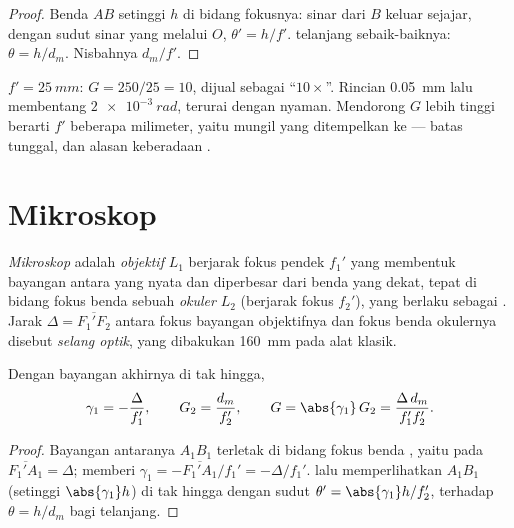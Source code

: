 \begin{proof}
Benda $AB$ setinggi $h$ di bidang fokusnya: sinar dari $B$ keluar
sejajar, dengan sudut sinar yang melalui $O$, $\theta' = h/f'$. 
telanjang sebaik-baiknya: $\theta = h/d_m$. Nisbahnya $d_m/f'$.
\end{proof}

\begin{example}\label{ex:b1:optical-instruments:loupe}
$f' = \qty{25}{mm}$: $G = 250/25 = 10$, dijual sebagai ``$10\times$''.
Rincian \qty{0.05}{mm} lalu membentang $\qty{2e-3}{rad}$, terurai dengan
nyaman. Mendorong $G$ lebih tinggi berarti $f'$ beberapa milimeter, yaitu
 mungil yang ditempelkan ke  --- batas  tunggal, dan
alasan keberadaan .
\end{example}

\section{Mikroskop}

\begin{definition}\label{def:b1:optical-instruments:microscope}
\emph{Mikroskop} adalah \emph{ objektif} $L_1$ berjarak fokus
pendek $f_1'$ yang membentuk bayangan antara yang nyata dan diperbesar
dari benda yang dekat, tepat di bidang fokus benda sebuah \emph{
okuler} $L_2$ (berjarak fokus $f_2'$), yang berlaku sebagai . Jarak $\Delta =
\overline{F_1'F_2}$ antara fokus bayangan
objektifnya dan fokus benda okulernya disebut \emph{selang
optik},
yang dibakukan \qty{160}{mm} pada alat klasik.
\end{definition}

\begin{proposition}\label{prop:b1:optical-instruments:microscope}
Dengan bayangan akhirnya di tak hingga,
\[
\gamma_1 = -\frac{\Delta}{f_1'}, \qquad G_2 = \frac{d_m}{f_2'},
\qquad G = \abs{\gamma_1}\,G_2 = \frac{\Delta\,d_m}{f_1' f_2'} .
\]
\end{proposition}

\begin{proof}
Bayangan antaranya $A_1B_1$ terletak di bidang fokus benda ,
yaitu pada $\overline{F_1'A_1} = \Delta$;  memberi
$\gamma_1 = -\overline{F_1'A_1}/f_1' = -\Delta/f_1'$.  lalu
memperlihatkan $A_1B_1$ (setinggi $\abs{\gamma_1} h$) di tak hingga
dengan sudut $\theta' = \abs{\gamma_1} h/f_2'$, terhadap
$\theta = h/d_m$ bagi  telanjang.
\end{proof}

